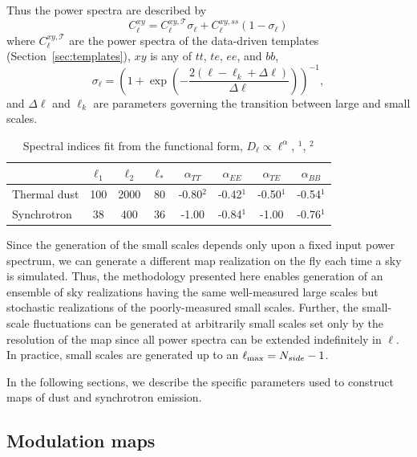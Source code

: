 Thus the power spectra are described by
\begin{equation}
    C_\ell^{xy} = C_\ell^{xy, \mathcal{T}}\sigma_\ell + C_\ell^{xy, ss}\left(1-\sigma_\ell\right)
\end{equation}
where $C_\ell^{xy, \mathcal{T}}$ are the power spectra of the data-driven templates (Section~\ref{sec:templates}), $xy$ is any of $tt$, $te$, $ee$, and $bb$,
\begin{equation}
\sigma_\ell  = \left( 1+  \exp \left( - \frac{2 (\ell - \ell_k  +\Delta \ell ) }{\Delta \ell}\right)   \right)^{-1},
\end{equation}
and $\Delta\ell$ and $\ell_k$ are parameters governing the transition between large and small scales.
 

\begin{table}[]
    \centering
    \footnotesize
    \begin{tabular}{lccccccc}
    \toprule 
   &   $ \ell_1  $&$\ell_2$   &$\ell_* $& $\alpha_{TT}$  & $\alpha_{EE}$ &$\alpha_{TE}$ &$\alpha_{BB}$ \\
   \midrule  
   Thermal dust & 100 & 2000 & 80 & -0.80$^2$ & -0.42$^{1}$& -0.50$^{1}$ & -0.54$^{1}$ \\ 
   Synchrotron & 38 & 400 & 36 &  -1.00& -0.84$^{1}$ & -1.00 & -0.76$^{1}$ \\
   \bottomrule
    \end{tabular}
    \caption{Spectral indices fit from the functional form,  $D_{\ell}\propto \ell^{\alpha}$, $^1$\citet{planck2016-l11A}, $^2$\citet{mivilledeschene:2016}}
    \label{tab:smallscale_par}
\end{table}

Since the generation of the small scales depends only upon a fixed input power spectrum, we can generate a different map realization on the fly each time a sky is simulated. Thus, the methodology presented here enables generation of an ensemble of sky realizations having the same well-measured large scales but stochastic realizations of the poorly-measured small scales. Further, the small-scale fluctuations can be generated at arbitrarily small scales set only by the resolution of the map since all power spectra can be extended indefinitely in $\ell$. In practice, small scales are generated up to an $\ell_{\rm max} = N_{side}-1$.

In the following sections, we describe the specific parameters used to construct maps of dust and synchrotron emission.

\subsection{Modulation maps} \label{subsec:modulation}

